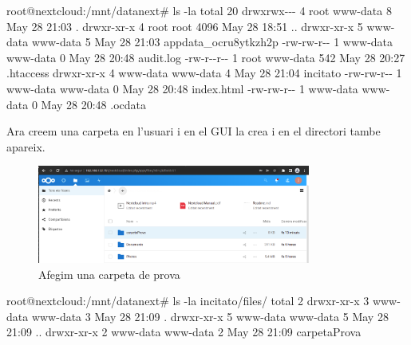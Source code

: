 \documentclass[
  10pt,
]{krantz}
\newenvironment{Shaded}{\begin{snugshade}}{\end{snugshade}}
\newcommand{\AttributeTok}[1]{\textcolor[rgb]{0.77,0.63,0.00}{#1}}
\newcommand{\ExtensionTok}[1]{#1}
\newcommand{\NormalTok}[1]{#1}
\begin{document}
\begin{Shaded}
\begin{Highlighting}[]
\ExtensionTok{root@nextcloud:/mnt/datanext\#}\NormalTok{ ls }\AttributeTok{{-}la}
\ExtensionTok{total}\NormalTok{ 20}
\ExtensionTok{drwxrwx{-}{-}{-}}\NormalTok{ 4 root     www{-}data    8 May 28 21:03 .}
\ExtensionTok{drwxr{-}xr{-}x}\NormalTok{ 4 root     root     4096 May 28 18:51 ..}
\ExtensionTok{drwxr{-}xr{-}x}\NormalTok{ 5 www{-}data www{-}data    5 May 28 21:03 appdata\_ocru8ytkzh2p}
\ExtensionTok{{-}rw{-}rw{-}r{-}{-}}\NormalTok{ 1 www{-}data www{-}data    0 May 28 20:48 audit.log}
\ExtensionTok{{-}rw{-}r{-}{-}r{-}{-}}\NormalTok{ 1 root     www{-}data  542 May 28 20:27 .htaccess}
\ExtensionTok{drwxr{-}xr{-}x}\NormalTok{ 4 www{-}data www{-}data    4 May 28 21:04 incitato}
\ExtensionTok{{-}rw{-}rw{-}r{-}{-}}\NormalTok{ 1 www{-}data www{-}data    0 May 28 20:48 index.html}
\ExtensionTok{{-}rw{-}rw{-}r{-}{-}}\NormalTok{ 1 www{-}data www{-}data    0 May 28 20:48 .ocdata}
\end{Highlighting}
\end{Shaded}

Ara creem una carpeta en l'usuari i en el GUI la crea i en el directori tambe apareix.

\begin{figure}
\centering
\includegraphics[width=0.8\textwidth,height=\textheight]{imatges/proxmox/carpetaProva.png}
\caption{Afegim una carpeta de prova}
\end{figure}

\begin{Shaded}
\begin{Highlighting}[]
\ExtensionTok{root@nextcloud:/mnt/datanext\#}\NormalTok{ ls }\AttributeTok{{-}la}\NormalTok{ incitato/files/}
\ExtensionTok{total}\NormalTok{ 2}
\ExtensionTok{drwxr{-}xr{-}x}\NormalTok{ 3 www{-}data www{-}data 3 May 28 21:09 .}
\ExtensionTok{drwxr{-}xr{-}x}\NormalTok{ 5 www{-}data www{-}data 5 May 28 21:09 ..}
\ExtensionTok{drwxr{-}xr{-}x}\NormalTok{ 2 www{-}data www{-}data 2 May 28 21:09 carpetaProva}
\end{Highlighting}
\end{Shaded}
\end{document}
